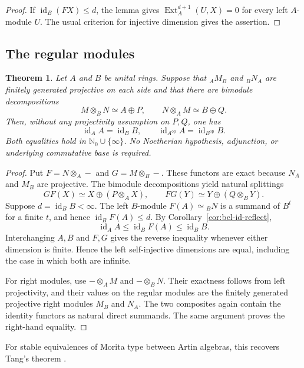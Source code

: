 \documentclass[12pt,a4paper,english,reqno]{amsart}
\numberwithin{equation}{section}
\theoremstyle{plain}
\newtheorem{theorem}{Theorem}[section]
\theoremstyle{definition}
\begin{document}
\begin{proof}
If $\operatorname{id}_B(FX)\leq d$, the lemma gives
$\operatorname{Ext}^{d+1}_A(U,X)=0$ for every left $A$-module $U$.
The usual criterion for injective dimension gives the assertion.
\end{proof}

\subsection{The regular modules}

\begin{theorem}
\label{thm:bel-selfinj}
Let $A$ and $B$ be unital rings.  Suppose that
${}_AM_B$ and ${}_BN_A$ are finitely generated projective on each side
and that there are bimodule decompositions
\[
 M\otimes_BN\simeq A\oplus P,
 \qquad N\otimes_AM\simeq B\oplus Q.
\]
Then, without any projectivity assumption on $P,Q$, one has
\[
 \operatorname{id}_A A=\operatorname{id}_B B,
 \qquad
 \operatorname{id}_{A^{\mathrm{op}}} A
   =\operatorname{id}_{B^{\mathrm{op}}} B.
\]
Both equalities hold in $\mathbb N_0\cup\{\infty\}$.  No Noetherian
hypothesis, adjunction, or underlying commutative base is required.
\end{theorem}

\begin{proof}
Put $F=N\otimes_A-$ and $G=M\otimes_B-$.  These functors are exact
because $N_A$ and $M_B$ are projective.  The bimodule
decompositions yield natural splittings
\[
 GF(X)\simeq X\oplus(P\otimes_AX),
 \qquad FG(Y)\simeq Y\oplus(Q\otimes_BY).
\]
Suppose $d=\operatorname{id}_B B<\infty$.  The left $B$-module
$F(A)\simeq{}_BN$ is a summand of $B^t$ for a finite $t$, and hence
$\operatorname{id}_B F(A)\leq d$.  By
Corollary~\ref{cor:bel-id-reflect},
\[
 \operatorname{id}_A A
 \leq\operatorname{id}_B F(A)
 \leq\operatorname{id}_B B.
\]
Interchanging $A,B$ and $F,G$ gives the reverse inequality whenever
either dimension is finite.  Hence the left self-injective dimensions
are equal, including the case in which both are infinite.

For right modules, use $-\otimes_AM$ and $-\otimes_BN$.  Their exactness
follows from left projectivity, and their values on the regular modules are
the finitely generated projective right modules $M_B$ and $N_A$.
The two composites again contain the identity functors as natural direct
summands.  The same argument proves the right-hand equality.
\end{proof}

For stable equivalences of Morita type between Artin algebras, this
recovers Tang's theorem \cite[Theorem~1]{bel-Tang2026}.
\end{document}
